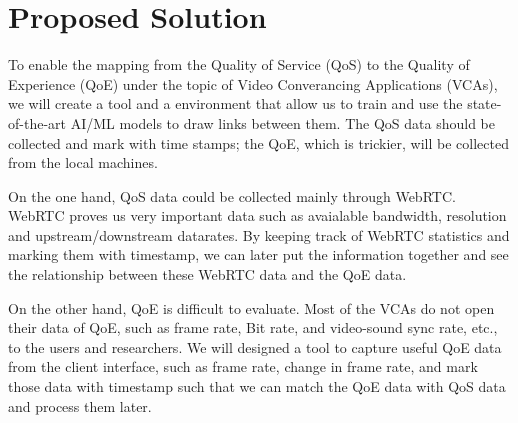 \section{Proposed Solution}\label{proposedsolution}
    To enable the mapping from the Quality of Service (QoS) to the Quality of Experience (QoE) under the topic of Video Converancing Applications (VCAs), we will create a tool and a environment that allow us to train and use the state-of-the-art AI/ML models to draw links between them. The QoS data should be collected and mark with time stamps; the QoE, which is trickier, will be collected from the local machines. 

    On the one hand, QoS data could be collected mainly through WebRTC. WebRTC proves us very important data such as avaialable bandwidth, resolution and upstream/downstream datarates. By keeping track of WebRTC statistics and marking them with timestamp, we can later put the information together and see the relationship between these WebRTC data and the QoE data.

    On the other hand, QoE is difficult to evaluate. Most of the VCAs do not open their data of QoE, such as frame rate, Bit rate, and video-sound sync rate, etc., to the users and researchers. We will designed a tool to capture useful QoE data from the client interface, such as frame rate, change in frame rate, and mark those data with timestamp such that we can match the QoE data with QoS data and process them later.  

